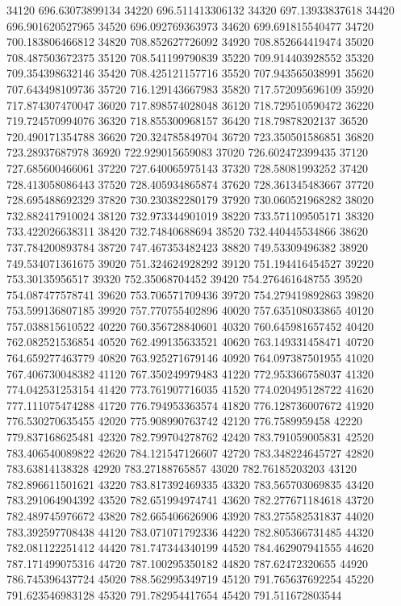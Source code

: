 {34120 696.63073899134
34220 696.511413306132
34320 697.13933837618
34420 696.901620527965
34520 696.092769363973
34620 699.691815540477
34720 700.183806466812
34820 708.852627726092
34920 708.852664419474
35020 708.487503672375
35120 708.541199790839
35220 709.914403928552
35320 709.354398632146
35420 708.425121157716
35520 707.943565038991
35620 707.643498109736
35720 716.129143667983
35820 717.572095696109
35920 717.874307470047
36020 717.898574028048
36120 718.729510590472
36220 719.724570994076
36320 718.855300968157
36420 718.79878202137
36520 720.490171354788
36620 720.324785849704
36720 723.350501586851
36820 723.28937687978
36920 722.929015659083
37020 726.602472399435
37120 727.685600466061
37220 727.640065975143
37320 728.58081993252
37420 728.413058086443
37520 728.405934865874
37620 728.361345483667
37720 728.695488692329
37820 730.230382280179
37920 730.060521968282
38020 732.882417910024
38120 732.973344901019
38220 733.571109505171
38320 733.422026638311
38420 732.74840688694
38520 732.440445534866
38620 737.784200893784
38720 747.467353482423
38820 749.53309496382
38920 749.534071361675
39020 751.324624928292
39120 751.194416454527
39220 753.30135956517
39320 752.35068704452
39420 754.276461648755
39520 754.087477578741
39620 753.706571709436
39720 754.279419892863
39820 753.599136807185
39920 757.770755402896
40020 757.635108033865
40120 757.038815610522
40220 760.356728840601
40320 760.645981657452
40420 762.082521536854
40520 762.499135633521
40620 763.149331458471
40720 764.659277463779
40820 763.925271679146
40920 764.097387501955
41020 767.406730048382
41120 767.350249979483
41220 772.953366758037
41320 774.042531253154
41420 773.761907716035
41520 774.020495128722
41620 777.111075474288
41720 776.794953363574
41820 776.128736007672
41920 776.530270635455
42020 775.908990763742
42120 776.7589959458
42220 779.837168625481
42320 782.799704278762
42420 783.791059005831
42520 783.406540089822
42620 784.121547126607
42720 783.348224645727
42820 783.63814138328
42920 783.27188765857
43020 782.76185203203
43120 782.896611501621
43220 783.817392469335
43320 783.565703069835
43420 783.291064904392
43520 782.651994974741
43620 782.277671184618
43720 782.489745976672
43820 782.665406626906
43920 783.275582531837
44020 783.392597708438
44120 783.071071792336
44220 782.805366731485
44320 782.081122251412
44420 781.747344340199
44520 784.462907941555
44620 787.171499075316
44720 787.100295350182
44820 787.62472320655
44920 786.745396437724
45020 788.562995349719
45120 791.765637692254
45220 791.623546983128
45320 791.782954417654
45420 791.511672803544
}
